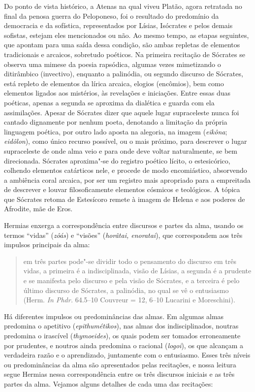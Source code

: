 Do ponto de vista histórico, a Atenas na qual viveu Platão, agora
retratada no final da penosa guerra do Peloponeso, foi o resultado do
predomínio da democracia e da sofística, representados por Lísias,
Isócrates e pelos demais sofistas, estejam eles mencionados ou não. Ao
mesmo tempo, as etapas seguintes, que apontam para uma saída dessa
condição, são ambas repletas de elementos tradicionais e arcaicos,
sobretudo poéticos. Na primeira recitação de Sócrates se observa uma
mimese da poesia rapsódica, algumas vezes mimetizando o ditirâmbico
(invectivo), enquanto a palinódia, ou segundo discurso de Sócrates, está
repleto de elementos da lírica arcaica, elogios (encômios), bem como
elementos ligados aos mistérios, às revelações e iniciações. Entre essas
duas poéticas, apenas a segunda se aproxima da dialética e guarda com
ela assimilações. Apesar de Sócrates dizer que aquele lugar supraceleste
nunca foi cantado dignamente por nenhum poeta, denotando a limitação da
própria linguagem poética, por outro lado aposta na alegoria, na imagem
(\emph{eikôna}; \emph{eidôlon}), como único recurso possível, ou o mais
próximo, para descrever o lugar supraceleste de onde alma veio e para
onde deve voltar naturalmente, se bem direcionada. Sócrates aproxima"-se
do registro poético lícito, o estesicórico, colhendo elementos
catárticos nele, e procede de modo encomiástico, absorvendo a ambiência
coral arcaica, por ser um registro mais apropriado para a empreitada de
descrever e louvar filosoficamente elementos cósmicos e teológicos. A tópica que Sócrates retoma de Estesícoro remete à imagem de Helena e aos
poderes de Afrodite, mãe de Eros.

Hermias enxerga a correspondência entre discursos e partes da alma,
usando os termos ``vidas'' (\emph{zôás}) e ``visões'' (\emph{horâtai,
enoratai}), que correspondem aos três impulsos principais da alma:

 

\begin{quote}
em três partes pode"-se dividir todo o pensamento do discurso em três
vidas, a primeira é a indisciplinada, visão de Lísias, a segunda é a
prudente e se manifesta pelo discurso e pela visão de Sócrates, e a
terceira é pelo último discurso de Sócrates, a palinódia, no qual se vê
o entusiasmo (Herm. \emph{In Phdr.} 64.5--10 Couvreur = 12, 6--10
Lucarini e Moreschini).
\end{quote}

 

Há diferentes impulsos ou predominâncias das almas. Em algumas almas
predomina o apetitivo (\emph{epithumétikos}), nas almas dos
indisciplinados, noutras predomina o irascível (\emph{thymoeides}), os
quais podem ser tomados erroneamente por prudentes, e noutros ainda
predomina o racional (\emph{logoi}), os que alcançam a verdadeira razão
e o aprendizado, juntamente com o entusiasmo. Esses três níveis ou
predominâncias da alma são apresentados pelas recitações, e nossa leitura
segue Hermias nessa correspondência entre os três discursos iniciais e
as três partes da alma. Vejamos alguns detalhes de cada uma das
recitações:


